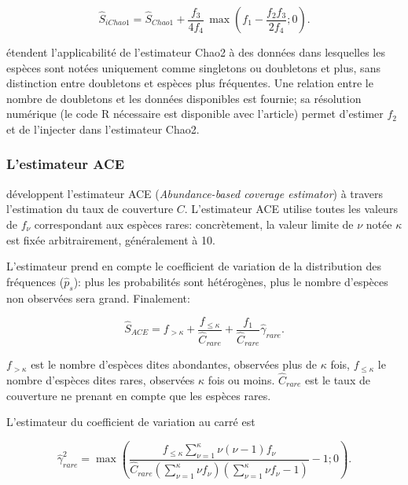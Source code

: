 \documentclass[
  11pt,
  american,
  a4paper,
  extrafontsizes,onecolumn,openright
  ]{memoir}
\begin{document}
\begin{equation}
  \label{eq:iChao1}
  {\hat{S}}_\mathit{iChao1} 
  = {\hat{S}}_\mathit{Chao1} 
    + \frac{f_{3}}{4f_{4}}
    \,\max\left( f_{1} - \frac{f_{2}f_{3}}{2f_{4}} ; 0 \right).
\end{equation}

\textcite{Chao2017} étendent l'applicabilité de l'estimateur Chao2 à des données dans lesquelles les espèces sont notées uniquement comme singletons ou doubletons et plus, sans distinction entre doubletons et espèces plus fréquentes.
Une relation entre le nombre de doubletons et les données disponibles est fournie; sa résolution numérique (le code R nécessaire est disponible avec l'article) permet d'estimer \(f_{2}\) et de l'injecter dans l'estimateur Chao2.

\hypertarget{lestimateur-ace}{%
\subsubsection{L'estimateur ACE}\label{lestimateur-ace}}

\textcite{Chao1992} développent l'estimateur ACE (\emph{Abundance-based coverage estimator}) à travers l'estimation du taux de couverture \(C\).
L'estimateur ACE utilise toutes les valeurs de \(f_\nu\) correspondant aux espèces rares: concrètement, la valeur limite de \(\nu\) notée \(\kappa\) est fixée arbitrairement, généralement à 10.

L'estimateur prend en compte le coefficient de variation de la distribution des fréquences (\({\hat{p}}_s\)): plus les probabilités sont hétérogènes, plus le nombre d'espèces non observées sera grand.
Finalement:

\begin{equation}
  \label{eq:ACE}
  \hat{S}_{\mathit{ACE}} 
  = f_{>\kappa} + \frac{f_{\le\kappa}}{\hat{C}_\mathit{rare}} + \frac{f_{1}}{{\hat{C}}_\mathit{rare}}{\hat{\gamma}}_\mathit{rare}.
\end{equation}

\(f_{>\kappa}\) est le nombre d'espèces dites abondantes, observées plus de \(\kappa\) fois, \(f_{\le\kappa}\) le nombre d'espèces dites rares, observées \(\kappa\) fois ou moins.
\(\hat{C}_\mathit{rare}\) est le taux de couverture ne prenant en compte que les espèces rares.

L'estimateur du coefficient de variation au carré est

\begin{equation}
  \label{eq:ACEcv}
  \hat{\gamma}^{2}_\mathit{rare} 
  = \max\left( 
    \frac{
      f_{\le\kappa} \sum^{\kappa}_{\nu=1}{\nu\left( \nu - 1 \right){f_\nu}}
    }{
      \hat{C}_\mathit{rare} \left( \sum^{\kappa}_{\nu = 1}{\nu f_{\nu}} \right) \left( \sum^{\kappa}_{\nu = 1}{\nu f_{\nu}} - 1 \right)
    } - 1 ; 0
  \right).
\end{equation}
\end{document}
